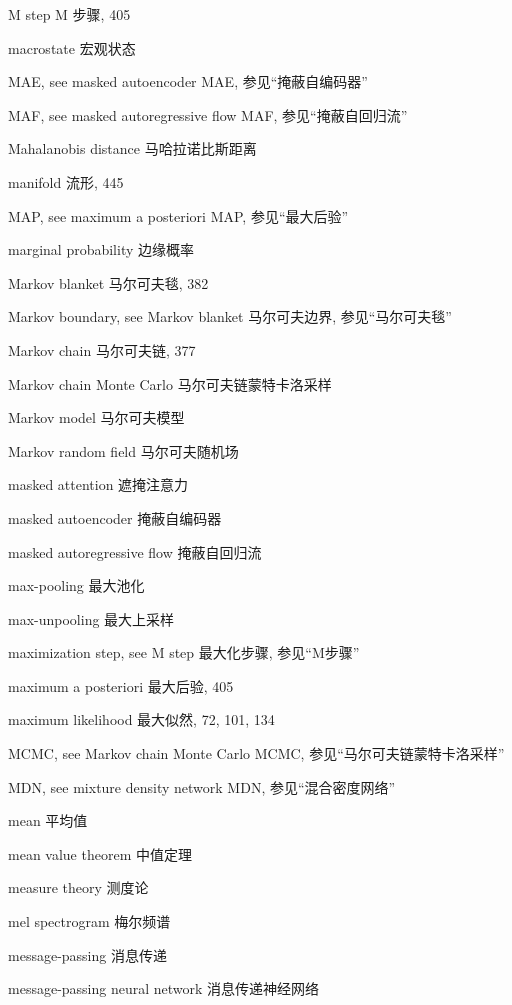 M step  M 步骤, 405 \par
macrostate  宏观状态 \par
MAE, see masked autoencoder  MAE, 参见“掩蔽自编码器” \par
MAF, see masked autoregressive flow  MAF, 参见“掩蔽自回归流” \par
Mahalanobis distance  马哈拉诺比斯距离 \par
manifold  流形, 445 \par
MAP, see maximum a posteriori  MAP, 参见“最大后验” \par
marginal probability  边缘概率 \par
Markov blanket  马尔可夫毯, 382 \par
Markov boundary, see Markov blanket  马尔可夫边界, 参见“马尔可夫毯” \par
Markov chain  马尔可夫链, 377 \par
Markov chain Monte Carlo  马尔可夫链蒙特卡洛采样 \par
Markov model  马尔可夫模型 \par
Markov random field  马尔可夫随机场 \par
masked attention  遮掩注意力 \par
masked autoencoder  掩蔽自编码器 \par
masked autoregressive flow  掩蔽自回归流 \par
max-pooling  最大池化 \par
max-unpooling  最大上采样 \par
maximization step, see M step  最大化步骤, 参见“M步骤” \par
maximum a posteriori  最大后验, 405 \par
maximum likelihood  最大似然, 72, 101, 134 \par
MCMC, see Markov chain Monte Carlo  MCMC, 参见“马尔可夫链蒙特卡洛采样” \par
MDN, see mixture density network  MDN, 参见“混合密度网络” \par
mean  平均值 \par
mean value theorem  中值定理 \par
measure theory  测度论 \par
mel spectrogram  梅尔频谱 \par
message-passing  消息传递 \par
message-passing neural network  消息传递神经网络 \par

